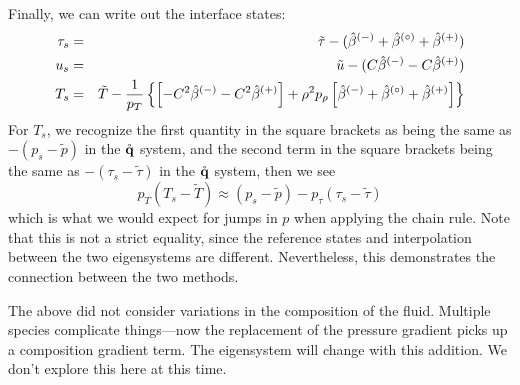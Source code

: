Finally, we can write out the interface states:
\begin{eqnarray}
\tau_s &=& \tilde{\tau} - (\hat{\beta}^\evm + \hat{\beta}^\evz + \hat{\beta}^\evp) \\
%
u_s &=& \tilde{u} - (C \hat{\beta}^\evm - C \hat{\beta}^\evp) \\
%
T_s &=& \tilde{T} - \frac{1}{p_T} \left \{
   \left [ -C^2 \hat{\beta}^\evm - C^2 \hat{\beta}^\evp \right ] +
   \rho^2 p_\rho \left [ \hat{\beta}^\evm + \hat{\beta}^\evz + \hat{\beta}^\evp \right ] \right \}
\end{eqnarray}
For $T_s$, we recognize the first quantity in the square brackets as
being the same as $-(p_s - \tilde{p})$ in the $\mathring{{\bf q}}$ system, and the
second term in the square brackets being the same as $-(\tau_s - \tilde{\tau})$
in the $\mathring{{\bf q}}$ system, then we see
\begin{equation}
p_T (T_s - \tilde{T} ) \approx (p_s - \tilde{p} ) - p_\tau (\tau_s - \tilde{\tau})
\end{equation}
which is what we would expect for jumps in $p$ when applying the chain
rule.  Note that this is not a strict equality, since the reference
states and interpolation between the two eigensystems are different.
Nevertheless, this demonstrates the connection between the two
methods.

The above did not consider variations in the composition of the fluid.
Multiple species complicate things---now the replacement of the
pressure gradient picks up a composition gradient term.
The eigensystem will change with this addition.  We don't explore this here at this
time.
\fi

